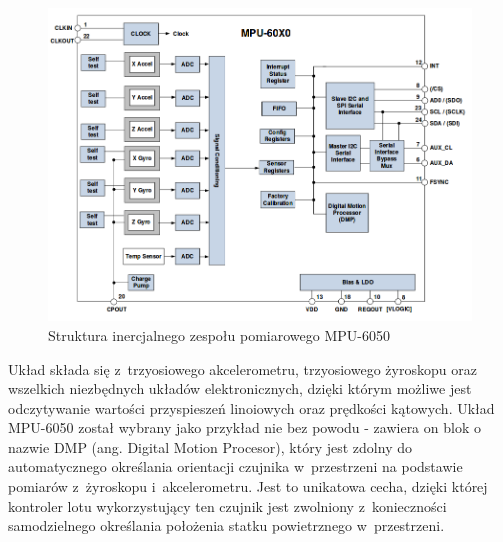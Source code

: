 \begin{figure}[H]
	\centering
	\includegraphics[scale=0.5]{Pictures/IMU.png}
        \caption[Struktura inercjalnego zespołu pomiarowego]{Struktura inercjalnego zespołu pomiarowego MPU-6050~\cite{ds_mpu6050}}
        \label{fig:IMU}
\end{figure}

Układ składa się z~trzyosiowego akcelerometru, trzyosiowego żyroskopu oraz wszelkich niezbędnych układów elektronicznych, dzięki którym możliwe jest odczytywanie wartości przyspieszeń linoiowych oraz prędkości kątowych. Układ MPU-6050 został wybrany jako przykład nie bez powodu - zawiera on blok o nazwie DMP (ang. Digital Motion Procesor), który jest zdolny do automatycznego określania orientacji czujnika w~przestrzeni na podstawie pomiarów z~żyroskopu i~akcelerometru. Jest to unikatowa cecha, dzięki której kontroler lotu wykorzystujący ten czujnik jest zwolniony z~konieczności samodzielnego określania  położenia statku powietrznego w~przestrzeni. 
